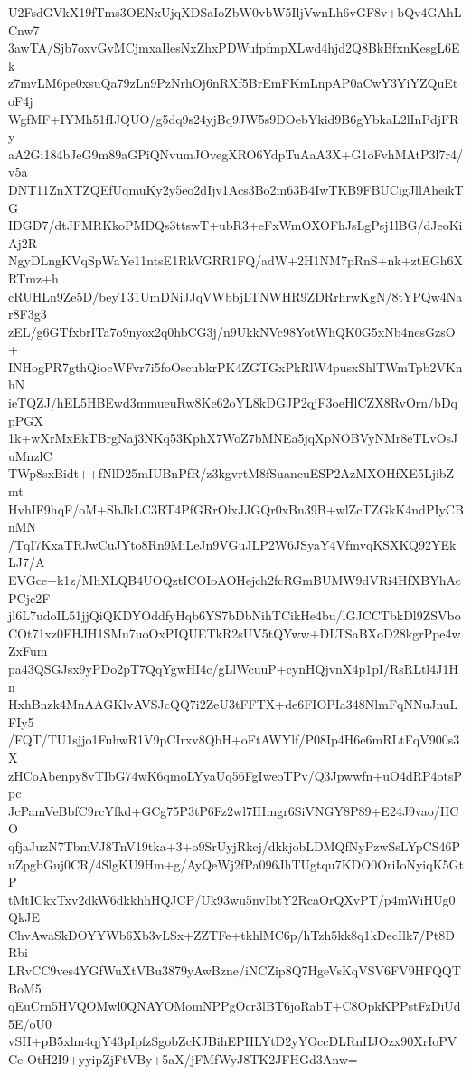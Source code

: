 U2FsdGVkX19fTms3OENxUjqXDSaIoZbW0vbW5IljVwnLh6vGF8v+bQv4GAhLCnw7
3awTA/Sjb7oxvGvMCjmxaIlesNxZhxPDWufpfmpXLwd4hjd2Q8BkBfxnKesgL6Ek
z7mvLM6pe0xsuQa79zLn9PzNrhOj6nRXf5BrEmFKmLnpAP0aCwY3YiYZQuEtoF4j
WgfMF+IYMh51fIJQUO/g5dq9s24yjBq9JW5s9DOebYkid9B6gYbkaL2lInPdjFRy
aA2Gi184bJeG9m89aGPiQNvumJOvegXRO6YdpTuAaA3X+G1oFvhMAtP3l7r4/v5a
DNT11ZnXTZQEfUqmuKy2y5eo2dIjv1Acs3Bo2m63B4IwTKB9FBUCigJllAheikTG
IDGD7/dtJFMRKkoPMDQs3ttswT+ubR3+eFxWmOXOFhJsLgPsj1lBG/dJeoKiAj2R
NgyDLngKVqSpWaYe11ntsE1RkVGRR1FQ/adW+2H1NM7pRnS+nk+ztEGh6XRTmz+h
cRUHLn9Ze5D/beyT31UmDNiJJqVWbbjLTNWHR9ZDRrhrwKgN/8tYPQw4Nar8F3g3
zEL/g6GTfxbrITa7o9nyox2q0hbCG3j/n9UkkNVc98YotWhQK0G5xNb4nesGzsO+
INHogPR7gthQiocWFvr7i5foOscubkrPK4ZGTGxPkRlW4pusxShlTWmTpb2VKnhN
ieTQZJ/hEL5HBEwd3mmueuRw8Ke62oYL8kDGJP2qjF3oeHlCZX8RvOrn/bDqpPGX
1k+wXrMxEkTBrgNaj3NKq53KphX7WoZ7bMNEa5jqXpNOBVyNMr8eTLvOsJuMnzlC
TWp8sxBidt++fNlD25mIUBnPfR/z3kgvrtM8fSuancuESP2AzMXOHfXE5LjibZmt
HvhIF9hqF/oM+SbJkLC3RT4PfGRrOlxJJGQr0xBn39B+wlZcTZGkK4ndPIyCBnMN
/TqI7KxaTRJwCuJYto8Rn9MiLeJn9VGuJLP2W6JSyaY4VfmvqKSXKQ92YEkLJ7/A
EVGce+k1z/MhXLQB4UOQztICOIoAOHejch2fcRGmBUMW9dVRi4HfXBYhAcPCjc2F
jl6L7udoIL51jjQiQKDYOddfyHqb6YS7bDbNihTCikHe4bu/lGJCCTbkDl9ZSVbo
COt71xz0FHJH1SMu7uoOxPIQUETkR2sUV5tQYww+DLTSaBXoD28kgrPpe4wZxFum
pa43QSGJsx9yPDo2pT7QqYgwHI4c/gLlWcuuP+cynHQjvnX4p1pI/RsRLtl4J1Hn
HxhBnzk4MnAAGKlvAVSJcQQ7i2ZeU3tFFTX+de6FIOPIa348NlmFqNNuJnuLFIy5
/FQT/TU1sjjo1FuhwR1V9pCIrxv8QbH+oFtAWYlf/P08Ip4H6e6mRLtFqV900s3X
zHCoAbenpy8vTIbG74wK6qmoLYyaUq56FgIweoTPv/Q3Jpwwfn+uO4dRP4otsPpc
JcPamVeBbfC9rcYfkd+GCg75P3tP6Fz2wl7IHmgr6SiVNGY8P89+E24J9vao/HCO
qfjaJuzN7TbmVJ8TnV19tka+3+o9SrUyjRkcj/dkkjobLDMQfNyPzwSsLYpCS46P
uZpgbGuj0CR/4SlgKU9Hm+g/AyQeWj2fPa096JhTUgtqu7KDO0OriIoNyiqK5GtP
tMtICkxTxv2dkW6dkkhhHQJCP/Uk93wu5nvIbtY2RcaOrQXvPT/p4mWiHUg0QkJE
ChvAwaSkDOYYWb6Xb3vLSx+ZZTFe+tkhlMC6p/hTzh5kk8q1kDecIlk7/Pt8DRbi
LRvCC9ves4YGfWuXtVBu3879yAwBzne/iNCZip8Q7HgeVsKqVSV6FV9HFQQTBoM5
qEuCrn5HVQOMwl0QNAYOMomNPPgOcr3lBT6joRabT+C8OpkKPPstFzDiUd5E/oU0
vSH+pB5xlm4qjY43pIpfzSgobZcKJBihEPHLYtD2yYOccDLRnHJOzx90XrIoPVCe
OtH2I9+yyipZjFtVBy+5aX/jFMfWyJ8TK2JFHGd3Anw=
